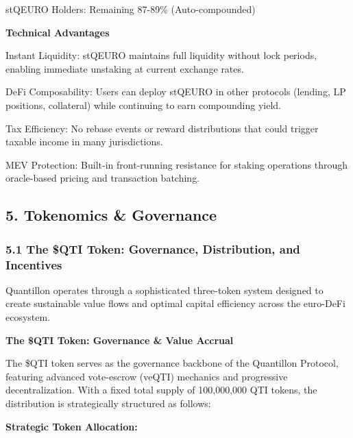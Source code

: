 stQEURO Holders: Remaining 87-89\% (Auto-compounded)

\textbf{Technical Advantages}

Instant Liquidity: stQEURO maintains full liquidity without lock
periods, enabling immediate unstaking at current exchange rates.

DeFi Composability: Users can deploy stQEURO in other protocols
(lending, LP positions, collateral) while continuing to earn compounding
yield.

Tax Efficiency: No rebase events or reward distributions that could
trigger taxable income in many jurisdictions.

MEV Protection: Built-in front-running resistance for staking operations
through oracle-based pricing and transaction batching.

\hypertarget{tokenomics-governance}{%
\subsection{5. Tokenomics \& Governance}\label{tokenomics-governance}}

\hypertarget{the-qti-token-governance-distribution-and-incentives}{%
\subsubsection{5.1 The \$QTI Token: Governance, Distribution, and
Incentives}\label{the-qti-token-governance-distribution-and-incentives}}

Quantillon operates through a sophisticated three-token system designed
to create sustainable value flows and optimal capital efficiency across
the euro-DeFi ecosystem.

\textbf{The \$QTI Token: Governance \& Value Accrual}

The \$QTI token serves as the governance backbone of the Quantillon
Protocol, featuring advanced vote-escrow (veQTI) mechanics and
progressive decentralization. With a fixed total supply of 100,000,000
QTI tokens, the distribution is strategically structured as follows:

\textbf{Strategic Token Allocation:}

